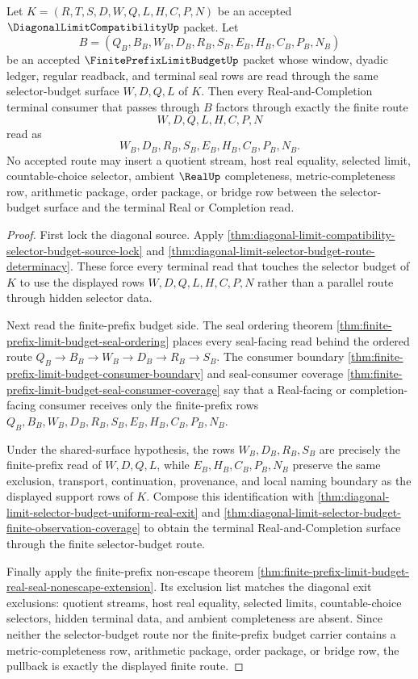 \begin{theorem}
\label{thm:diagonal-limit-selector-budget-finite-prefix-budget-pullback}
Let $K=(R,T,S,D,W,Q,L,H,C,P,N)$ be an accepted $\DiagonalLimitCompatibilityUp$ packet. Let
$$
B=(Q_B,B_B,W_B,D_B,R_B,S_B,E_B,H_B,C_B,P_B,N_B)
$$
be an accepted $\FinitePrefixLimitBudgetUp$ packet whose window, dyadic ledger, regular readback, and terminal seal rows are read through the same selector-budget surface $W,D,Q,L$ of $K$. Then every Real-and-Completion terminal consumer that passes through $B$ factors through exactly the finite route
$$
W,D,Q,L,H,C,P,N
$$
read as
$$
W_B,D_B,R_B,S_B,E_B,H_B,C_B,P_B,N_B.
$$
No accepted route may insert a quotient stream, host real equality, selected limit, countable-choice selector, ambient $\RealUp$ completeness, metric-completeness row, arithmetic package, order package, or bridge row between the selector-budget surface and the terminal Real or Completion read.
\end{theorem}
\begin{proof}
First lock the diagonal source. Apply \autoref{thm:diagonal-limit-compatibility-selector-budget-source-lock} and \autoref{thm:diagonal-limit-selector-budget-route-determinacy}. These force every terminal read that touches the selector budget of $K$ to use the displayed rows $W,D,Q,L,H,C,P,N$ rather than a parallel route through hidden selector data.

Next read the finite-prefix budget side. The seal ordering theorem \autoref{thm:finite-prefix-limit-budget-seal-ordering} places every seal-facing read behind the ordered route $Q_B \to B_B \to W_B \to D_B \to R_B \to S_B$. The consumer boundary \autoref{thm:finite-prefix-limit-budget-consumer-boundary} and seal-consumer coverage \autoref{thm:finite-prefix-limit-budget-seal-consumer-coverage} say that a Real-facing or completion-facing consumer receives only the finite-prefix rows $Q_B,B_B,W_B,D_B,R_B,S_B,E_B,H_B,C_B,P_B,N_B$.

Under the shared-surface hypothesis, the rows $W_B,D_B,R_B,S_B$ are precisely the finite-prefix read of $W,D,Q,L$, while $E_B,H_B,C_B,P_B,N_B$ preserve the same exclusion, transport, continuation, provenance, and local naming boundary as the displayed support rows of $K$. Compose this identification with \autoref{thm:diagonal-limit-selector-budget-uniform-real-exit} and \autoref{thm:diagonal-limit-selector-budget-finite-observation-coverage} to obtain the terminal Real-and-Completion surface through the finite selector-budget route.

Finally apply the finite-prefix non-escape theorem \autoref{thm:finite-prefix-limit-budget-real-seal-nonescape-extension}. Its exclusion list matches the diagonal exit exclusions: quotient streams, host real equality, selected limits, countable-choice selectors, hidden terminal data, and ambient completeness are absent. Since neither the selector-budget route nor the finite-prefix budget carrier contains a metric-completeness row, arithmetic package, order package, or bridge row, the pullback is exactly the displayed finite route.
\end{proof}
